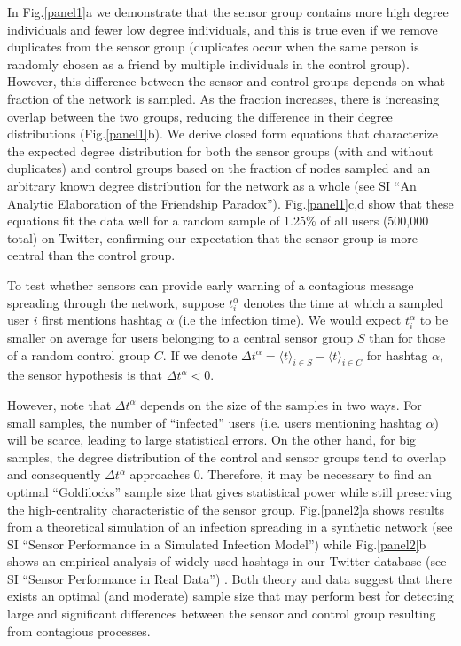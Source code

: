 In Fig.\ref{panel1}a we demonstrate that the sensor group contains more high degree individuals and fewer low degree individuals, and this is true even if we remove duplicates from the sensor group (duplicates occur when the same person is randomly chosen as a friend by multiple individuals in the control group).  However, this difference between the sensor and control groups depends on what fraction of the network is sampled.  As the fraction increases, there is increasing overlap between the two groups, reducing the difference in their degree distributions (Fig.\ref{panel1}b).  We derive closed form equations that characterize the expected degree distribution for both the sensor groups (with and without duplicates) and control groups based on the fraction of nodes sampled and an arbitrary known degree distribution for the network as a whole (see SI ``An Analytic Elaboration of the Friendship Paradox'').  Fig.\ref{panel1}c,d show that these equations fit the data well for a random sample of 1.25\% of all users (500,000 total) on Twitter, confirming our expectation that the sensor group is more central than the control group.  

To test whether sensors can provide early warning of a contagious message spreading through the network, suppose $t^\alpha_i$ denotes the time at which a sampled user $i$ first mentions hashtag $\alpha$ (i.e the infection time).  We would expect $t^\alpha_i$ to be smaller on average for users belonging to a central sensor group $S$ than for those of a random control group $C$.  If we denote $\Delta t^\alpha=\langle t \rangle_{i \in S} - \langle t \rangle_{i \in C}$ for hashtag $\alpha$, the sensor hypothesis is that $\Delta t^\alpha<0$.  

However, note that $\Delta t^\alpha$ depends on the size of the samples in two ways.  For small samples, the number of ``infected'' users (i.e. users mentioning hashtag $\alpha$) will be scarce, leading to large statistical errors.  On the other hand, for big samples, the degree distribution of the control and sensor groups tend to overlap and consequently $\Delta t^\alpha$  approaches 0.  Therefore, it may be necessary to find an optimal ``Goldilocks'' sample size that gives statistical power while still preserving the high-centrality characteristic of the sensor group.  Fig.\ref{panel2}a shows results from a theoretical simulation of an infection \cite{30} spreading in a synthetic network (see SI ``Sensor Performance in a Simulated Infection Model'') while Fig.\ref{panel2}b shows an empirical analysis of widely used hashtags in our Twitter database (see SI ``Sensor Performance in Real Data'') .  Both theory and data suggest that there exists an optimal (and moderate) sample size that may perform best for detecting large and significant differences between the sensor and control group resulting from contagious processes. 


